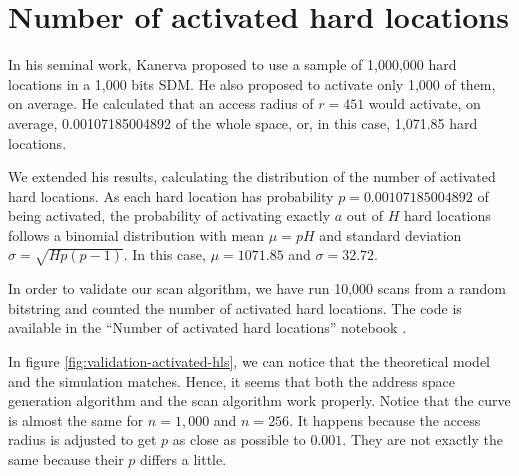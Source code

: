 \section{Number of activated hard locations}

In his seminal work, Kanerva proposed to use a sample of 1,000,000 hard locations in a 1,000 bits SDM. He also proposed to activate only 1,000 of them, on average. He calculated that an access radius of $r=451$ would activate, on average, 0.00107185004892 of the whole space, or, in this case, 1,071.85 hard locations.

We extended his results, calculating the distribution of the number of activated hard locations. As each hard location has probability $p=0.00107185004892$ of being activated, the probability of activating exactly $a$ out of $H$ hard locations follows a binomial distribution with mean $\mu = pH$ and standard deviation $\sigma = \sqrt{Hp(p-1)}$. In this case, $\mu = 1071.85$ and $\sigma = 32.72$.

In order to validate our scan algorithm, we have run 10,000 scans from a random bitstring and counted the number of activated hard locations. The code is available in the ``Number of activated hard locations'' notebook \citep{sdmframework}.

In figure \ref{fig:validation-activated-hls}, we can notice that the theoretical model and the simulation matches. Hence, it seems that both the address space generation algorithm and the scan algorithm work properly. Notice that the curve is almost the same for $n=1,000$ and $n=256$. It happens because the access radius is adjusted to get $p$ as close as possible to $0.001$. They are not exactly the same because their $p$ differs a little.


